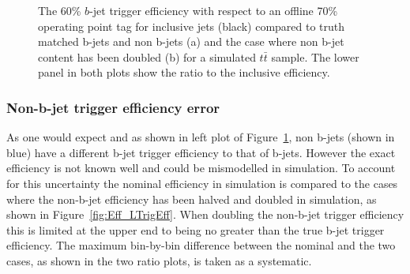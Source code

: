\begin{figure}[!ht]
\begin{center}
  \end{center}
  \caption{The 60\% $b$-jet trigger efficiency with respect to an offline 70\% operating point tag
    for inclusive jets (black) compared to truth matched b-jets and non b-jets (a) and the case where non b-jet content has been doubled (b) for a simulated $t\bar{t}$ sample.
    The lower panel in both plots show the ratio to the inclusive efficiency.
  }
  \label{fig:Eff_Purity}
\end{figure}

\subsubsection{Non-b-jet trigger efficiency error}
\label{sec:trig-lightTrigEff}

As one would expect and as shown in left plot of Figure~\ref{fig:Eff_Purity}, non b-jets (shown in blue) have a different b-jet trigger efficiency to that of b-jets.
However the exact efficiency is not known well and could be mismodelled in simulation.
To account for this uncertainty the nominal efficiency in simulation is compared
to the cases where the non-b-jet efficiency has been halved and doubled in simulation, as shown in Figure~\ref{fig:Eff_LTrigEff}.
When doubling the non-b-jet trigger efficiency this is limited at the upper end to being no greater than the true b-jet trigger efficiency.
The maximum bin-by-bin difference between the nominal and the two cases, as shown in the two ratio plots, is taken as a systematic.

